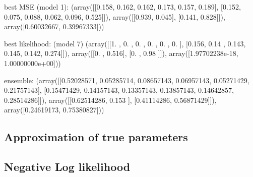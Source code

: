 best MSE (model 1):
(array([[0.158, 0.162, 0.162, 0.173, 0.157, 0.189],
        [0.152, 0.075, 0.088, 0.062, 0.096, 0.525]]),
 array([[0.939, 0.045],
        [0.141, 0.828]]),
 array([0.60032667, 0.39967333]))

best likelihood: (model 7)
(array([[1.   , 0.   , 0.   , 0.   , 0.   , 0.   ],
        [0.156, 0.14 , 0.143, 0.145, 0.142, 0.274]]),
 array([[0.   , 0.516],
        [0.   , 0.98 ]]),
 array([1.97702238e-18, 1.00000000e+00]))

ensemble:
(array([[0.52028571, 0.05285714, 0.08657143, 0.06957143, 0.05271429,
         0.21757143],
        [0.15471429, 0.14157143, 0.13357143, 0.13857143, 0.14642857,
         0.28514286]]),
 array([[0.62514286, 0.153     ],
        [0.41114286, 0.56871429]]),
 array([0.24619173, 0.75380827]))


\subsection{Approximation of true parameters}


\subsection{Negative Log likelihood}




